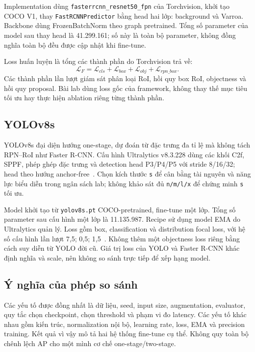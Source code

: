 \documentclass[a4paper,10pt,twocolumn]{article}
\newcommand{\FR}{Faster R-CNN}
\newcommand{\YO}{YOLOv8s}
\begin{document}
Implementation dùng \texttt{fasterrcnn\_resnet50\_fpn} của Torchvision, khởi tạo
COCO V1, thay \texttt{FastRCNNPredictor} bằng head hai lớp: background và Varroa.
Backbone dùng FrozenBatchNorm theo graph pretrained. Tổng số parameter của model
sau thay head là 41.299.161; số này là toàn bộ parameter, không đồng nghĩa toàn bộ
đều được cập nhật khi fine-tune.

Loss huấn luyện là tổng các thành phần do Torchvision trả về:
\begin{equation}
\mathcal L_{F}=\mathcal L_{cls}+\mathcal L_{box}
 +\mathcal L_{obj}+\mathcal L_{rpn\_box}.
\end{equation}
Các thành phần lần lượt giám sát phân loại RoI, hồi quy box RoI, objectness và hồi quy
proposal. Bài lab dùng loss gốc của framework, không thay thế mục tiêu tối ưu hay
thực hiện ablation riêng từng thành phần.

\subsection{YOLOv8s}
\YO{} đại diện hướng one-stage, dự đoán từ đặc trưng đa tỉ lệ mà không tách RPN--RoI
như \FR{}. Cấu hình Ultralytics v8.3.228 dùng các khối C2f, SPPF, phép ghép đặc trưng
và detection head P3/P4/P5 với stride 8/16/32; head theo hướng anchor-free~\cite{yoloyaml,yolodocs}.
Chọn kích thước \texttt{s} để cân bằng tài nguyên và năng lực biểu diễn trong ngân sách
lab; không khảo sát đủ \texttt{n/m/l/x} để chứng minh \texttt{s} tối ưu.

Model khởi tạo từ \texttt{yolov8s.pt} COCO-pretrained, fine-tune một lớp. Tổng số
parameter sau cấu hình một lớp là 11.135.987. Recipe sử dụng model EMA do Ultralytics
quản lý. Loss gồm box, classification và distribution focal loss, với hệ số cấu hình
lần lượt 7,5; 0,5; 1,5~\cite{yololoss}. Không thêm một objectness loss riêng bằng cách
suy diễn từ YOLO đời cũ. Giá trị loss của YOLO và \FR{} khác định nghĩa và scale,
nên không so sánh trực tiếp để xếp hạng model.

\subsection{Ý nghĩa của phép so sánh}
Các yếu tố được đồng nhất là dữ liệu, seed, input size, augmentation, evaluator,
quy tắc chọn checkpoint, chọn threshold và phạm vi đo latency. Các yếu tố khác nhau
gồm kiến trúc, normalization nội bộ, learning rate, loss, EMA và precision training.
Kết quả vì vậy mô tả hai hệ thống fine-tune cụ thể. Không quy toàn bộ chênh lệch AP
cho một mình cơ chế one-stage/two-stage.
\end{document}
